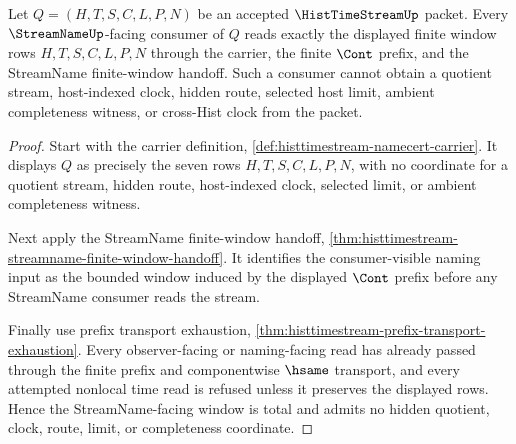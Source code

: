 \begin{theorem}
\label{thm:histtimestream-streamname-window-totality}
Let $Q=(H,T,S,C,L,P,N)$ be an accepted $\HistTimeStreamUp$ packet. Every $\StreamNameUp$-facing consumer of $Q$ reads exactly the displayed finite window rows $H,T,S,C,L,P,N$ through the carrier, the finite $\Cont$ prefix, and the StreamName finite-window handoff. Such a consumer cannot obtain a quotient stream, host-indexed clock, hidden route, selected host limit, ambient completeness witness, or cross-Hist clock from the packet.
\end{theorem}
\begin{proof}
Start with the carrier definition, \autoref{def:histtimestream-namecert-carrier}. It displays $Q$ as precisely the seven rows $H,T,S,C,L,P,N$, with no coordinate for a quotient stream, hidden route, host-indexed clock, selected limit, or ambient completeness witness.

Next apply the StreamName finite-window handoff, \autoref{thm:histtimestream-streamname-finite-window-handoff}. It identifies the consumer-visible naming input as the bounded window induced by the displayed $\Cont$ prefix before any StreamName consumer reads the stream.

Finally use prefix transport exhaustion, \autoref{thm:histtimestream-prefix-transport-exhaustion}. Every observer-facing or naming-facing read has already passed through the finite prefix and componentwise $\hsame$ transport, and every attempted nonlocal time read is refused unless it preserves the displayed rows. Hence the StreamName-facing window is total and admits no hidden quotient, clock, route, limit, or completeness coordinate.
\end{proof}

